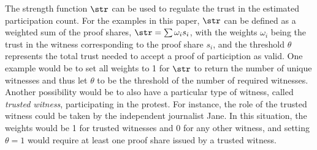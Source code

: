 The strength function \(\str\) can be used to regulate the trust in the 
estimated participation count.
For the examples in this paper, \(\str\) can be defined as a weighted sum of 
the proof shares, \(\str = \sum \omega_i s_i\), with the weights \(\omega_i\) 
being the trust in the witness corresponding to the proof share \(s_i\), and 
the threshold \(\theta\) represents the total trust needed to accept a proof of 
particiption as valid.
One example would be to set all weights to 1 for \(\str\) to return the number of unique witnesses and thus let \(\theta\) to be the threshold of the number of required witnesses.
Another possibility would be to also have a particular type of witness, called 
\emph{trusted witness}, participating in the protest. For instance, the role of 
the trusted witness could be taken by the independent journalist Jane.
In this situation, the weights would be 1 for trusted witnesses and 
0 for any other witness, and
setting \(\theta = 1\) would require at least one proof share issued by a 
trusted witness.

